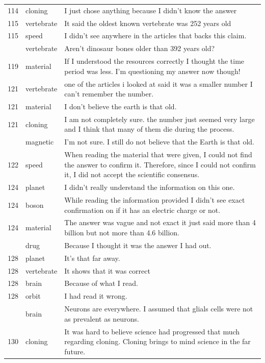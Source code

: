 \documentclass[
  doc,floatsintext]{apa6}
\begin{document}
\begin{longtable}[t]{>{}r>{}l>{\raggedright\arraybackslash}p{30em}}
114 & cloning & I just chose anything because I didn't know the answer\\
115 & vertebrate & It said the oldest known vertebrate was 252 years old\\
115 & speed & I didn’t see anywhere in the articles that backs this claim.\\
\addlinespace
118 & vertebrate & Aren't dinosaur bones older than 392 years old?\\
119 & material & If I understood the resources correctly I thought the time period was less. I'm questioning my answer now though!\\
121 & vertebrate & one of the articles i looked at said it was a smaller number I can't remember the number.\\
121 & material & I don't believe the earth is that old.\\
121 & cloning & I am not completely sure.  the number just seemed very large and I think that many of them die during the process.\\
\addlinespace
121 & magnetic & I'm not sure.  I still do not believe that the Earth is that old.\\
122 & speed & When reading the material that were given, I could not find the answer to confirm it. Therefore, since I could not confirm it, I did not accept the scientific consensus.\\
124 & planet & I didn't really understand the information on this one.\\
124 & boson & While reading the information provided I didn't see exact confirmation on if it has an electric charge or not.\\
124 & material & The answer was vague and not exact it just said more than 4 billion but not more than 4.6 billion.\\
\addlinespace
128 & drug & Because I thought it was the answer I had out.\\
128 & planet & It’s that far away.\\
128 & vertebrate & It shows that it was correct\\
128 & brain & Because of what I read.\\
128 & orbit & I had read it wrong.\\
\addlinespace
130 & brain & Neurons are everywhere.  I assumed that glials cells were not as prevalent as neurons.\\
130 & cloning & It was hard to believe science had progressed that much regarding cloning.  Cloning brings to mind science in the far future.\\

\end{longtable}
\end{document}
